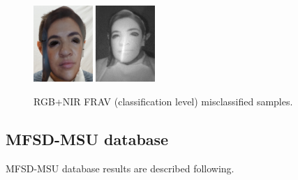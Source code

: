 \begin{figure}[htb]
\centering
\includegraphics[width=0.2\textwidth]{images_databases/frav_rgb_128.JPG}
\includegraphics[width=0.2\textwidth]{images_databases/frav_nir_128.JPG}
\caption{RGB+NIR FRAV (classification level) misclassified samples.} \label{fig:frav_clas_miscl}
\end{figure}

\subsection{MFSD-MSU database}
MFSD-MSU database results are described following.\\

